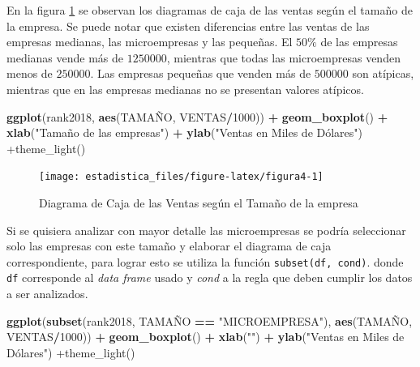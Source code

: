 \documentclass[]{book}
\newenvironment{Shaded}{\begin{snugshade}}{\end{snugshade}}
\newcommand{\DecValTok}[1]{\textcolor[rgb]{0.00,0.00,0.81}{#1}}
\newcommand{\KeywordTok}[1]{\textcolor[rgb]{0.13,0.29,0.53}{\textbf{#1}}}
\newcommand{\NormalTok}[1]{#1}
\newcommand{\OperatorTok}[1]{\textcolor[rgb]{0.81,0.36,0.00}{\textbf{#1}}}
\newcommand{\StringTok}[1]{\textcolor[rgb]{0.31,0.60,0.02}{#1}}
\begin{document}
En la figura \ref{fig:figura4} se observan los diagramas de caja de las ventas según el tamaño de la empresa. Se puede notar que existen diferencias entre las ventas de las empresas medianas, las microempresas y las pequeñas. El \(50\%\) de las empresas medianas vende más de \(1250000\), mientras que todas las microempresas venden menos de \(250000\). Las empresas pequeñas que venden más de \(500000\) son atípicas, mientras que en las empresas medianas no se presentan valores atípicos.

\begin{Shaded}
\begin{Highlighting}[]
\KeywordTok{ggplot}\NormalTok{(rank2018, }\KeywordTok{aes}\NormalTok{(TAMAÑO, VENTAS}\OperatorTok{/}\DecValTok{1000}\NormalTok{)) }\OperatorTok{+}\StringTok{ }
\StringTok{  }\KeywordTok{geom_boxplot}\NormalTok{() }\OperatorTok{+}\StringTok{ }\KeywordTok{xlab}\NormalTok{(}\StringTok{"Tamaño de las empresas"}\NormalTok{) }\OperatorTok{+}
\StringTok{  }\KeywordTok{ylab}\NormalTok{(}\StringTok{"Ventas en Miles de Dólares") +theme_light()}
\end{Highlighting}
\end{Shaded}

\begin{figure}[h!]

{\centering \texttt{[image: estadistica\_files/figure-latex/figura4-1]} 

}

\caption{Diagrama de Caja de las Ventas según el Tamaño de la empresa}\label{fig:figura4}
\end{figure}

Si se quisiera analizar con mayor detalle las microempresas se podría seleccionar solo las empresas con este tamaño y elaborar el diagrama de caja correspondiente, para lograr esto se utiliza la función \texttt{subset(df,\ cond)}. donde \texttt{df} corresponde al \emph{data frame} usado y \emph{cond} a la regla que deben cumplir los datos a ser analizados.

\begin{Shaded}
\begin{Highlighting}[]
\KeywordTok{ggplot}\NormalTok{(}\KeywordTok{subset}\NormalTok{(rank2018, TAMAÑO }\OperatorTok{==}\StringTok{ "MICROEMPRESA"}\NormalTok{), }\KeywordTok{aes}\NormalTok{(TAMAÑO, VENTAS}\OperatorTok{/}\DecValTok{1000}\NormalTok{)) }\OperatorTok{+}\StringTok{ }
\StringTok{  }\KeywordTok{geom_boxplot}\NormalTok{() }\OperatorTok{+}\StringTok{ }\KeywordTok{xlab}\NormalTok{(}\StringTok{""}\NormalTok{) }\OperatorTok{+}
\StringTok{  }\KeywordTok{ylab}\NormalTok{(}\StringTok{"Ventas en Miles de Dólares") +theme_light()}
\end{Highlighting}
\end{Shaded}
\end{document}

